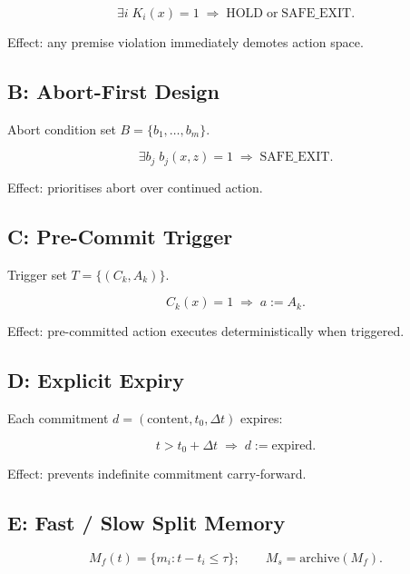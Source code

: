 \begin{equation}
\exists i\; K_i(x) = 1
\;\Rightarrow\;
\mathrm{HOLD}\; \text{or}\; \mathrm{SAFE\_EXIT}.
\end{equation}

\noindent
Effect: any premise violation immediately demotes action space.

\subsection{B: Abort-First Design}

Abort condition set $B = \{b_1, \ldots, b_m\}$.

\begin{equation}
\exists b_j\; b_j(x, z) = 1 \;\Rightarrow\; \mathrm{SAFE\_EXIT}.
\end{equation}

\noindent
Effect: prioritises abort over continued action.

\subsection{C: Pre-Commit Trigger}

Trigger set $T = \{(C_k, A_k)\}$.

\begin{equation}
C_k(x) = 1 \;\Rightarrow\; a := A_k.
\end{equation}

\noindent
Effect: pre-committed action executes deterministically when
triggered.

\subsection{D: Explicit Expiry}

Each commitment $d = (\mathrm{content}, t_0, \Delta t)$ expires:

\begin{equation}
t > t_0 + \Delta t \;\Rightarrow\; d := \mathrm{expired}.
\end{equation}

\noindent
Effect: prevents indefinite commitment carry-forward.

\subsection{E: Fast / Slow Split Memory}

\begin{equation}
M_f(t) = \{m_i : t - t_i \le \tau\}; \qquad
M_s = \mathrm{archive}(M_f).
\end{equation}

